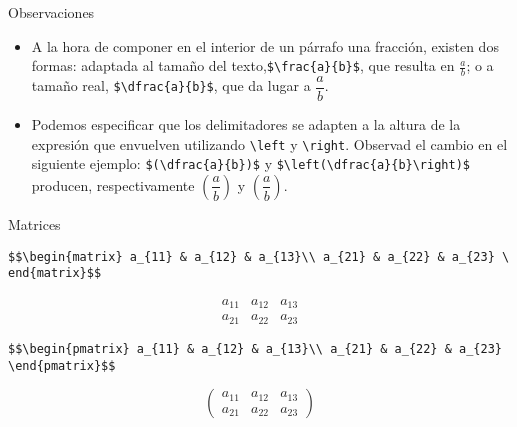 \documentclass[ignorenonframetext,]{beamer}
\begin{document}
\begin{frame}[fragile]{Observaciones}
\protect\hypertarget{observaciones}{}

\begin{itemize}
\item
  A la hora de componer en el interior de un párrafo una fracción,
  existen dos formas: adaptada al tamaño del
  texto,\texttt{\$\textbackslash{}frac\{a\}\{b\}\$}, que resulta en
  \(\frac{a}{b}\); o a tamaño real,
  \texttt{\$\textbackslash{}dfrac\{a\}\{b\}\$}, que da lugar a
  \(\dfrac{a}{b}\).
\item
  Podemos especificar que los delimitadores se adapten a la altura de la
  expresión que envuelven utilizando \texttt{\textbackslash{}left} y
  \texttt{\textbackslash{}right}. Observad el cambio en el siguiente
  ejemplo: \texttt{\$(\textbackslash{}dfrac\{a\}\{b\})\$} y
  \texttt{\$\textbackslash{}left(\textbackslash{}dfrac\{a\}\{b\}\textbackslash{}right)\$}
  producen, respectivamente \((\dfrac{a}{b})\) y
  \(\left(\dfrac{a}{b}\right)\).
\end{itemize}

\end{frame}

\begin{frame}[fragile]{Matrices}
\protect\hypertarget{matrices}{}

\texttt{\$\$\textbackslash{}begin\{matrix\}\ a\_\{11\}\ \&\ a\_\{12\}\ \&\ a\_\{13\}\textbackslash{}\textbackslash{}\ a\_\{21\}\ \&\ a\_\{22\}\ \&\ a\_\{23\}\ \textbackslash{}end\{matrix\}\$\$}

\[\begin{matrix}
a_{11} & a_{12} & a_{13}\\
a_{21} & a_{22} & a_{23}
\end{matrix}\]

\texttt{\$\$\textbackslash{}begin\{pmatrix\}\ a\_\{11\}\ \&\ a\_\{12\}\ \&\ a\_\{13\}\textbackslash{}\textbackslash{}\ a\_\{21\}\ \&\ a\_\{22\}\ \&\ a\_\{23\}\ \textbackslash{}end\{pmatrix\}\$\$}

\[\begin{pmatrix}
a_{11} & a_{12} & a_{13}\\
a_{21} & a_{22} & a_{23}
\end{pmatrix}\]

\end{frame}
\end{document}
